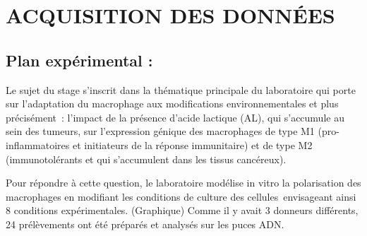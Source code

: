 \documentclass[a4paper,10pt]{article}
\begin{document}
\section{ACQUISITION DES DONN\'{E}ES }

\subsection{ Plan expérimental :}
Le sujet du stage s’inscrit dans la thématique principale du laboratoire qui porte sur l’adaptation du macrophage aux modifications environnementales et plus précisément : l’impact de la présence d’acide lactique (AL), qui s’accumule au sein des tumeurs, sur l’expression génique des macrophages de type M1 (pro-inflammatoires et initiateurs de la réponse immunitaire) et de type M2 (immunotolérants et qui s’accumulent dans les tissus cancéreux).

Pour répondre à cette question, le laboratoire modélise in vitro la polarisation des macrophages en modifiant les conditions de culture des cellules envisageant ainsi 8 conditions expérimentales. (Graphique) Comme il y avait 3 donneurs différents, 24 prélèvements ont été préparés et analysés sur les puces ADN.
\end{document}

